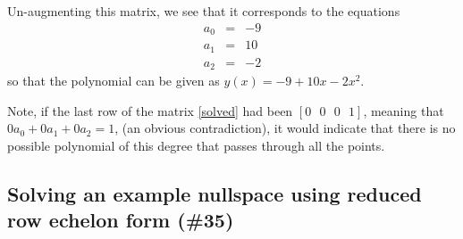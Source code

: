 \documentclass[10pt,letterpaper]{article}
\begin{document}
Un-augmenting this matrix, we see that it corresponds to the equations
\begin{eqnarray}
  a_0 &=& -9 \\
  a_1 &=& 10 \\
  a_2 &=& -2
\end{eqnarray}
so that the polynomial can be given as $y(x) = -9 + 10x -2 x ^{2}$.

Note, if the last row of the matrix \ref{solved} had been $[ 0 \text{ } 0 \text{ } 0 \text{ } 1]$, meaning that $0 a_0 + 0 a_1 + 0 a_2 = 1$, (an obvious contradiction), it would indicate that there is no possible polynomial of this degree that passes through all the points.
\subsection{Solving an example nullspace using reduced row echelon form (\#35)}
\label{sec-2_2}
\end{document}
